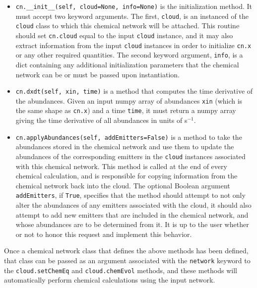 \documentclass[12pt]{article}
\begin{document}
\begin{itemize}
\item \verb+cn.__init__(self, cloud=None, info=None)+ is the initialization method. It must accept two keyword arguments. The first, \verb=cloud=, is an instanced of the \verb=cloud= class to which this chemical network will be attached. This routine should set \verb+cn.cloud+ equal to the input \verb=cloud= instance, and it may also extract information from the input \verb=cloud= instances in order to initialize \verb=cn.x= or any other required quantities. The second keyword argument, \verb=info=, is a dict containing any additional initialization parameters that the chemical network can be or must be passed upon instantiation.
\item \verb+cn.dxdt(self, xin, time)+ is a method that computes the time derivative of the abundances. Given an input numpy array of abundances \verb=xin= (which is the same shape as \verb=cn.x=) and a time \verb=time=, it must return a numpy array giving the time derivative of all abundances in units of s$^{-1}$.
\item \verb+cn.applyAbundances(self, addEmitters=False)+ is a method to take the abundances stored in the chemical network and use them to update the abundances of the corresponding emitters in the \verb=cloud= instances associated with this chemical network. This method is called at the end of every chemical calculation, and is responsible for copying information from the chemical network back into the cloud. The optional Boolean argument \verb=addEmitters=, if \verb=True=, specifies that the method should attempt to not only alter the abundances of any emitters associated with the cloud, it should also attempt to add new emitters that are included in the chemical network, and whose abundances are to be determined from it. It is up to the user whether or not to honor this request and implement this behavior.
\end{itemize}

Once a chemical network class that defines the above methods has been defined, that class can be passed as an argument associated with the \verb=network= keyword to the \verb=cloud.setChemEq= and \verb=cloud.chemEvol= methods, and these methods will automatically perform chemical calculations using the input network.
\end{document}
